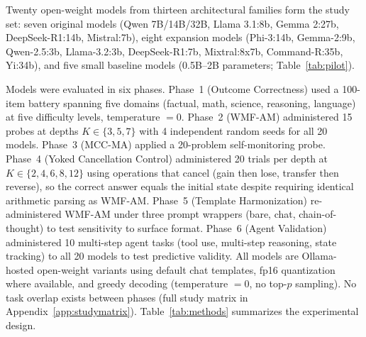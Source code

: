 \documentclass{article}
\begin{document}
{\sloppy
Twenty open-weight models from thirteen architectural families form the
study set: seven original models (Qwen 7B/14B/32B, Llama 3.1:8b,
Gemma 2:27b, DeepSeek-R1:14b, Mistral:7b), eight expansion models
(Phi-3:14b, Gemma-2:9b, Qwen-2.5:3b, Llama-3.2:3b, DeepSeek-R1:7b,
Mixtral:8x7b, Command-R:35b, Yi:34b), and five small baseline models
(0.5B--2B parameters; Table~\ref{tab:pilot}).
\par}
Models were evaluated in six phases. Phase~1 (Outcome Correctness)
used a 100-item battery spanning five domains (factual, math, science,
reasoning, language) at five difficulty levels, temperature $= 0$.
Phase~2 (WMF-AM) administered 15 probes at depths $K \in \{3,5,7\}$
with 4 independent random seeds for all 20 models.
Phase~3 (MCC-MA) applied a 20-problem self-monitoring probe.
Phase~4 (Yoked Cancellation Control) administered 20 trials per depth at
$K \in \{2,4,6,8,12\}$ using operations that cancel (gain then lose,
transfer then reverse), so the correct answer equals the initial state
despite requiring identical arithmetic parsing as WMF-AM.
Phase~5 (Template Harmonization) re-administered WMF-AM under three
prompt wrappers (bare, chat, chain-of-thought) to test sensitivity to
surface format.
Phase~6 (Agent Validation) administered 10 multi-step agent tasks
(tool use, multi-step reasoning, state tracking) to all 20 models
to test predictive validity.
All models are Ollama-hosted open-weight variants using default chat
templates, fp16 quantization where available, and greedy decoding
(temperature $= 0$, no top-$p$ sampling). No task overlap exists
between phases (full study matrix in Appendix~\ref{app:studymatrix}).
Table~\ref{tab:methods} summarizes the experimental design.

\begin{table}[t]
\centering
\small
\caption{\textbf{Study design summary.} All phases: temperature $= 0$,
greedy decoding, Ollama-hosted models with default chat templates.
All 20 models evaluated with 4 seeds for WMF-AM.}
\label{tab:methods}
\end{table}
\end{document}
